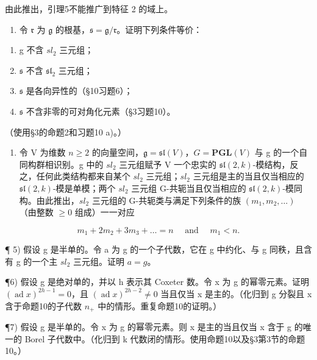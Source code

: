 由此推出，引理5不能推广到特征 2 的域上。

\begin{enumerate}
\def\labelenumi{\arabic{enumi})}
\setcounter{enumi}{2}
\tightlist
\item
  令 \(\mathfrak{r}\) 为 \(\mathfrak{g}\) 的根基，\(\mathfrak{s} = \mathfrak{g} / \mathfrak{r}\)。证明下列条件等价：
\end{enumerate}

\begin{enumerate}
\def\labelenumi{(\roman{enumi})}
\item
  g 不含 \(sl_{2}\) 三元组；
\item
  \(\mathfrak{s}\) 不含 \(\mathfrak{sl}_2\) 三元组；
\item
  \(\mathfrak{s}\) 是各向异性的（§10习题6）；
\item
  \(\mathfrak{s}\) 不含非零的可对角化元素（§3习题10）。
\end{enumerate}

（使用§3的命题2和习题10 a)。）

\begin{enumerate}
\def\labelenumi{\arabic{enumi})}
\setcounter{enumi}{3}
\tightlist
\item
  令 V 为维数 \(n \geq 2\) 的向量空间，\(\mathfrak{g} = \mathfrak{sl}(V)\)，\(G = \mathbf{PGL}(V)\) 与 g 的一个自同构群相识别。g 中的 \(sl_{2}\) 三元组赋予 V 一个忠实的 \(\mathfrak{sl}(2, k)\)-模结构，反之，任何此类结构都来自某个 \(sl_{2}\) 三元组；\(sl_{2}\) 三元组是主的当且仅当相应的 \(\mathfrak{sl}(2, k)\)-模是单模；两个 \(sl_{2}\) 三元组 G-共轭当且仅当相应的 \(\mathfrak{sl}(2, k)\)-模同构。由此推出，\(sl_{2}\) 三元组的 G-共轭类与满足下列条件的族 \((m_{1}, m_{2}, \ldots)\)（由整数 \(\geq 0\) 组成）一一对应
\end{enumerate}

\[
m _ {1} + 2 m _ {2} + 3 m _ {3} + \dots = n \quad \text { and } \quad m _ {1} <   n.
\]

¶ 5) 假设 g 是半单的。令 a 为 g 的一个子代数，它在 g 中约化、与 g 同秩，且含有 g 的一个主 \(sl_{2}\) 三元组。证明 \(a = g\)。

¶6) 假设 g 是绝对单的，并以 h 表示其 Coxeter 数。令 x 为 g 的幂零元素。证明 \((\operatorname{ad} x)^{2h-1} = 0\)，且 \((\operatorname{ad} x)^{2h-2} \neq 0\) 当且仅当 x 是主的。（化归到 g 分裂且 x 含于命题10的子代数 \(n_{+}\) 中的情形。重复命题10的证明。）

¶7) 假设 g 是半单的。令 x 为 g 的幂零元素。则 x 是主的当且仅当 x 含于 g 的唯一的 Borel 子代数中。（化归到 k 代数闭的情形。使用命题10以及§3第3节的命题10。）

